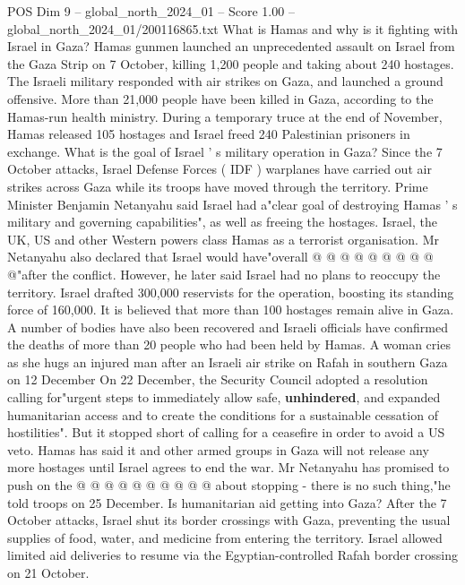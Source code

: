\begin{textsample}{POS Dim 9 – global\_north\_2024\_01 – Score 1.00 – global\_north\_2024\_01/200116865.txt}  \label{ex:f9_pos_264}
What is Hamas and why is it fighting with Israel in Gaza?
Hamas gunmen launched an unprecedented assault on Israel from the Gaza Strip on 7 October, killing 1,200 people and taking about 240 hostages.
The Israeli military responded with air strikes on Gaza, and launched a ground offensive.
More than 21,000 people have been killed in Gaza, according to the Hamas-run health ministry.
During a temporary truce at the end of November, Hamas released 105 hostages and Israel freed 240 Palestinian prisoners in exchange.
What is the goal of Israel ' s military operation in Gaza?
Since the 7 October attacks, Israel Defense Forces ( IDF ) warplanes have carried out air strikes across Gaza while its troops have moved through the territory.
Prime Minister Benjamin Netanyahu said Israel had a"clear goal of destroying Hamas ' s military and governing capabilities", as well as freeing the hostages.
Israel, the UK, US and other Western powers class Hamas as a terrorist organisation.
Mr Netanyahu also declared that Israel would have"overall @ @ @ @ @ @ @ @ @ @"after the conflict.
However, he later said Israel had no plans to reoccupy the territory.
Israel drafted 300,000 reservists for the operation, boosting its standing force of 160,000.
It is believed that more than 100 hostages remain alive in Gaza.
A number of bodies have also been recovered and Israeli officials have confirmed the deaths of more than 20 people who had been held by Hamas.
A woman cries as she hugs an injured man after an Israeli air strike on Rafah in southern Gaza on 12 December On 22 December, the Security Council adopted a resolution calling for"urgent steps to immediately allow safe, \textbf{unhindered}, and expanded humanitarian access and to create the conditions for a sustainable cessation of hostilities".
But it stopped short of calling for a ceasefire in order to avoid a US veto.
Hamas has said it and other armed groups in Gaza will not release any more hostages until Israel agrees to end the war.
Mr Netanyahu has promised to push on the @ @ @ @ @ @ @ @ @ @ about stopping - there is no such thing,"he told troops on 25 December.
Is humanitarian aid getting into Gaza?
After the 7 October attacks, Israel shut its border crossings with Gaza, preventing the usual supplies of food, water, and medicine from entering the territory.
Israel allowed limited aid deliveries to resume via the Egyptian-controlled Rafah border crossing on 21 October.

\end{textsample}
